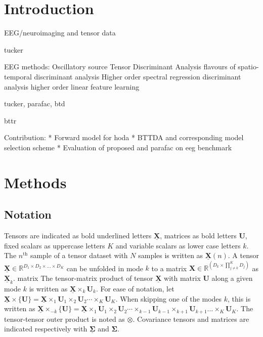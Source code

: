\documentclass[twocolumn]{article}
\newcommand{\ten}[1]{\underline{\mathbf{#1}}} %
\newcommand{\mat}[1]{\mathbf{#1}} %
\newcommand{\mpr}[2]{\times_{#2} {#1}_{#2}} %
\newcommand{\mmpr}[1]{\times\{#1\}} %
\newcommand{\mmprs}[2]{\times_{-#2}\{#1\}} %
\begin{document}
\section{Introduction}

EEG/neuroimaging and tensor data

tucker

EEG methods:
Oscillatory source Tensor Discriminant Analysis
flavours of spatio-temporal discriminant analysis
Higher order spectral regression discriminant analysis
higher order linear feature learning

tucker, parafac, btd

bttr



Contribution:
* Forward model for hoda
* BTTDA and corresponding model selection scheme
* Evaluation of proposed and parafac on eeg benchmark
\section{Methods}

\subsection{Notation}
Tensors are indicated as bold underlined letters $\ten{X}$, matrices as bold
letters $\mat{U}$, fixed scalars as uppercase letters $K$ and variable
scalars as lower case letters $k$.
The $n^\text{th}$ sample of a tensor dataset with $N$ samples is written as
$\ten{X}(n)$.
A tensor $\ten{X}\in \mathbb{R}^{D_1\times D_2 \times \ldots \times D_K}$ can be unfolded in mode
$k$ to a matrix $\mat{X}\in\mathbb{R}^{(D_k\times\prod_{j\neq k}^K D_j)}$ as
$\ten{X}_k$.
matrix
The tensor-matrix product of tensor $\ten{X}$ with matrix $\mat{U}$ along a
given mode $k$ is written as $\ten{X}\mpr{\mat{U}}{k}$. For ease of notation, let
$\ten{X}\mmpr{\mat{U}} =
	\ten{X}\mpr{\mat{U}}{1}\mpr{\mat{U}}{2}\cdots\mpr{\mat{U}}{K}$.
When skipping one of the modes $k$, this is
written as $\ten{X}\mmprs{\mat{U}}{k} =
	\ten{X}\mpr{\mat{U}}{1}\mpr{\mat{U}}{2}\cdots\mpr{\mat{U}}{k-1}\mpr{\mat{U}}{k+1}\ldots\mpr{\mat{U}}{K}$.
The tensor-tensor outer product is noted as $\otimes$.
Covariance tensors and matrices are indicated respectively with $\ten{\Sigma}$
and $\mat{\Sigma}$.
\end{document}
